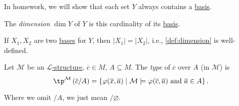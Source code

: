 \begin{note}
	In homework, we will show that each set \(Y\) always contains a \hyperref[def:basis]{basis}.
\end{note}

\begin{definition}[Dimension]\label{def:dimension}
	The \emph{dimension} \(\dim Y\) of \(Y\) is this cardinality of its \hyperref[def:basis]{basis}.
\end{definition}

\begin{remark}
	If \(X_1, X_2\) are two \hyperref[def:basis]{bases} for \(Y\), then \(\vert X_1 \vert = \vert X_2 \vert \), i.e., \autoref{def:dimension} is well-defined.
\end{remark}

\begin{definition}[Type]\label{def:type}
	Let \(\mathcal{M} \) be an \hyperref[def:structure]{\(\mathcal{L} \)-structure}, \(\overline{c} \in M\), \(A \subseteq M\). The \emph{type} of \(\overline{c} \) over \(A\) (in \(\mathcal{M} \)) is
	\[
		\tp^{\mathcal{M} }\left( \overline{c} / A \right) = \left\{ \varphi (\overline{x} , \overline{a} ) \mid \mathcal{M} \models \varphi (\overline{c} , \overline{a} ) \text{ and } \overline{a} \in A \right\}.
	\]
\end{definition}

\begin{notation}
	Where we omit \(/ A\), we just mean \(/ \varnothing\).
\end{notation}

